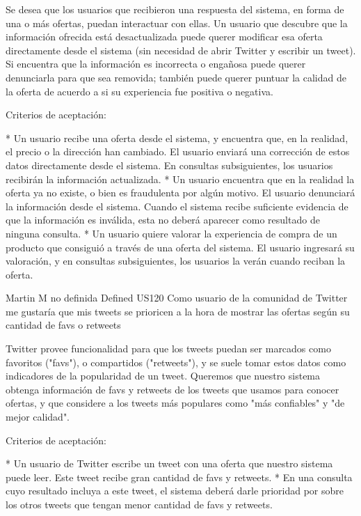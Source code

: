 	{Se desea que los usuarios que recibieron una respuesta del sistema, en forma
de una o más ofertas, puedan interactuar con ellas. Un usuario que descubre
que la información ofrecida está desactualizada puede querer modificar esa
oferta directamente desde el sistema (sin necesidad de abrir Twitter y
escribir un tweet). Si encuentra que la información es incorrecta o engañosa
puede querer denunciarla para que sea removida; también puede querer puntuar
la calidad de la oferta de acuerdo a si su experiencia fue positiva o
negativa.

  
Criterios de aceptación:

* Un usuario recibe una oferta desde el sistema, y encuentra que, en la realidad, el precio o la dirección han cambiado. El usuario enviará una corrección de estos datos directamente desde el sistema. En consultas subsiguientes, los usuarios recibirán la información actualizada.  
* Un usuario encuentra que en la realidad la oferta ya no existe, o bien es fraudulenta por algún motivo. El usuario denunciará la información desde el sistema. Cuando el sistema recibe suficiente evidencia de que la información es inválida, esta no deberá aparecer como resultado de ninguna consulta.  
* Un usuario quiere valorar la experiencia de compra de un producto que consiguió a través de una oferta del sistema. El usuario ingresará su valoración, y en consultas subsiguientes, los usuarios la verán cuando reciban la oferta.

} %
	{} %
	{} %
	{Martin M} %
	{no definida} %
	{Defined} %
\userStory
	{US120} %
	{Como usuario de la comunidad de Twitter me gustaría que mis tweets se prioricen a la hora de mostrar las ofertas según su cantidad de favs o retweets} %
	{Twitter provee funcionalidad para que los tweets puedan ser marcados como
favoritos ("favs"), o compartidos ("retweets"), y se suele tomar estos datos
como indicadores de la popularidad de un tweet. Queremos que nuestro sistema
obtenga información de favs y retweets de los tweets que usamos para conocer
ofertas, y que considere a los tweets más populares como "más confiables" y
"de mejor calidad".

  
Criterios de aceptación:

* Un usuario de Twitter escribe un tweet con una oferta que nuestro sistema puede leer. Este tweet recibe gran cantidad de favs y retweets.  
* En una consulta cuyo resultado incluya a este tweet, el sistema deberá darle prioridad por sobre los otros tweets que tengan menor cantidad de favs y retweets.

} %
